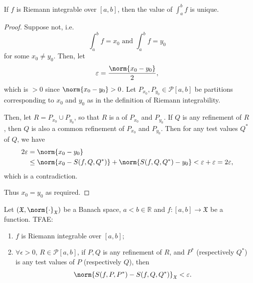 \documentclass[notoc,notitlepage]{tufte-book}
\begin{document}
\begin{propo}\label{propo:uniqueness_of_the_riemann_integral}
  If $f$ is Riemann integrable over $[a, b]$, then the value of $\int_{a}^{b} f$ 
  is unique.
\end{propo}

\begin{proof}
  Suppose not, i.e.
  \begin{equation*}
    \int_{a}^{b} f = x_0 \text{ and } \int_{a}^{b} f = y_0
  \end{equation*}
  for some $x_0 \neq y_0$. Then, let
  \begin{equation*}
    \epsilon = \frac{\norm{x_0 - y_0}}{2},
  \end{equation*}
  which is $> 0$ since $\norm{x_0 - y_0} > 0$. Let $P_{x_0}, P_{y_0} \in
  \mathcal{P}[a, b]$ be partitions corresponding to $x_0$ and $y_0$ as in the
  definition of Riemann integrability.

  Then, let $R = P_{x_0} \cup P_{y_0}$, so that $R$ is a  of $P_{x_0}$ and $P_{y_0}$. If $Q$ is any refinement of $R$, then
  $Q$ is also a common refinement of $P_{x_0}$ and $P_{y_0}$. Then for any test
  values $Q^*$ of $Q$, we have
  \begin{align*}
    2 \epsilon &= \norm{x_0 - y_0} \\
               &\leq \norm{x_0 - S(f, Q, Q^*)} + \norm{S(f, Q, Q^*) - y_0} <
               \epsilon + \epsilon = 2 \epsilon,
  \end{align*}
  which is a contradiction.

  Thus $x_0 = y_0$ as required.
\end{proof}

\begin{thm}\label{thm:cauchy_criterion_of_riemann_integrability}
  Let $(\mathfrak{X}, \norm{\cdot}_{\mathfrak{X}})$ be a Banach space, $a < b
  \in \mathbb{R}$ and $f : [a, b] \to \mathfrak{X}$ be a function. TFAE:
  \begin{enumerate}
    \item $f$ is Riemann integrable over $[a, b]$;
    \item $\forall \epsilon > 0, \, R \in \mathcal{P}[a, b]$, if $P, Q$ is any
      refinement of $R$, and $P^*$ (respectively $Q^*$) is any test values of
      $P$ (respectively $Q$), then
      \begin{equation*}
        \norm{S(f, P, P^*) - S(f, Q, Q^*)}_{\mathfrak{X}} < \epsilon.
      \end{equation*}
  \end{enumerate}
\end{thm}
\end{document}
